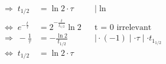 \documentclass{article}
\begin{document}
\begin{align}
      \Rightarrow\; t_{1/2} &= \ln 2 \cdot \tau
          && \mid \ln\\[4pt]                                                                                                                         
      \Leftrightarrow\; e^{- \frac{t}{\tau}}                                                                                                         
          &= 2^{- \frac{t}{t_{1/2}}} \ln 2
          && \text{t = 0 irrelevant}\\[4pt]                                                                                                          
      \Rightarrow\; - \frac{1}{\tau}                                                                                                                 
          &= - \frac{\ln 2}{t_{1/2}}
          && \mid \cdot (-1) \mid \cdot \tau \mid \cdot t_{1_{1/2}}\\[4pt]                                                                           
      \Leftrightarrow\; t_{1/2} &= \ln 2 \cdot \tau                                                                                                  
	\end{align}
  	\newpage
	
\end{document}
